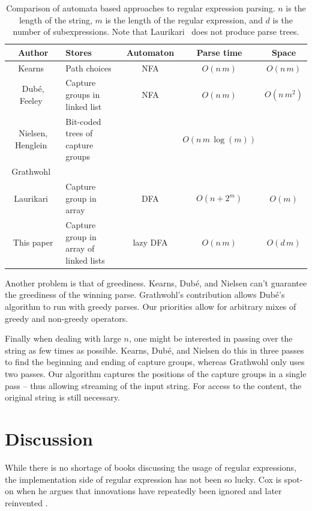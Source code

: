 \documentclass[11pt,a4paper,twoside,openright]{Thesis}
\theoremstyle{definition}
\newcommand{\seclabel}[1]{\label{sec:#1}}
\begin{document}
\begin{table}
\begin{tabular}{c|>{\centering}m{3cm}ccc}
  Author & Stores & Automaton & Parse time & Space \\
  \hline
  \hline
  Kearns~\cite{Kear91a}& Path choices & NFA & $O(n\,m)$ & $O(n\, m)$ \\
  \hline
  Dub\'e, Feeley~\cite{Dube00a}& Capture groups in linked 
  list & NFA & $O(n\,m)$ & $O(n\, m^2)$\\
  Nielsen, Henglein~\cite{Niel11a} & Bit-coded trees of capture groups  & & $O(n\, m\, \log(m))$ \\
  Grathwohl~\cite{Grat13a} \\
  \hline
  Laurikari~\cite{Laur00a}& Capture group in array & DFA & 
  $O(n+2^m)$ & $O(m)$\\
  This paper & Capture group in array of linked lists & lazy DFA 
  & $O(n\, m)$ & $O(d\, m)$ \\
\end{tabular}
\caption{Comparison of automata based approaches to regular expression 
parsing. $n$ is the length of the string, $m$ is the length of the regular 
expression, and $d$ is the number of subexpressions. Note that 
Laurikari~\cite{Laur00a} does not produce parse trees.}
\end{table}

Another problem is that of greediness. Kearns, Dub\'e, and Nielsen can't 
guarantee the greediness of the winning parse. Grathwohl's contribution 
allows Dub\'e's algorithm to run with greedy parses. Our priorities allow for 
arbitrary mixes of greedy and non-greedy operators.

Finally when dealing with large $n$, one might be interested in passing over 
the string as few times as possible. Kearns, Dub\'e, and Nielsen do this in 
three passes to find the beginning and ending of capture groups, whereas 
Grathwohl only uses two passes. Our algorithm captures the positions of the 
capture groups in a single pass -- thus allowing streaming of the input 
string. For access to the content, the original string is still necessary.

\section{Discussion}\seclabel{discuss-related}
While there is no shortage of books discussing the usage of regular
expressions, the implementation side of regular expression has not
been so lucky. Cox is spot-on when he argues that innovations have
repeatedly been ignored and later reinvented \cite{Cox07a,Cox09a,Cox10a}. 
\end{document}
